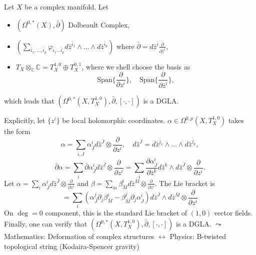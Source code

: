 \documentclass[10pt]{article}
\begin{document}
\begin{example}[Dolbeault + Lie = DGLA]
  Let $X$ be a complex manifold. Let
  \begin{itemize}
    \item $(\Omega^{0,*}(X), \bar{\partial})$ Dolbeault Complex,
    \item $(\sum_{\bar{i}_1,...,\bar{i}_p} \varphi_{\bar{i}_1...\bar{i}_p} d\bar{z}^{\bar{i}_1} \wedge ... \wedge d\bar{z}^{\bar{i}_p})$ where $\bar{\partial} = d\bar{z}^{\bar{i}} \frac{\partial}{\partial \bar{z}^i}$,
    \item $T_X \otimes_{\mathbb{C}} \mathbb{C} = T_X^{1,0} \oplus T_X^{0,1}$, where we shell choose the basis as
      \begin{equation*}
        \text{Span}\{\frac{\partial}{\partial z^i}\}, \quad \text{Span}\{\frac{\partial}{\partial \bar{z}^i}\},
      \end{equation*}
  \end{itemize}
  which leads that $(\Omega^{0,*}(X, T_X^{1,0}), \bar{\partial}, [\cdot,\cdot])$ is a DGLA.

  Explicitly, let $\{z^i\}$ be local holomorphic coordinates.
  $\alpha \in \Omega^{0,p}(X, T_X^{1,0})$ takes the form
  \begin{equation*}
    \alpha = \sum_{i,\bar{J}} \alpha_{\bar{J}}^i d\bar{z}^{\bar{J}} \otimes \frac{\partial}{\partial z^i}, \quad d\bar{z}^{\bar{J}} = d\bar{z}^{\bar{j}_1} \wedge ... \wedge d\bar{z}^{\bar{j}_p},
  \end{equation*}
  \begin{equation*}
    \bar{\partial}\alpha = \sum_i \bar{\partial}\alpha_{\bar{J}}^i d\bar{z}^{\bar{J}} \otimes \frac{\partial}{\partial z^i} = \sum_i \frac{\partial \alpha_{\bar{J}}^i}{\partial \bar{z}^k} d\bar{z}^k \wedge d\bar{z}^{\bar{J}} \otimes \frac{\partial}{\partial z^i}.
  \end{equation*}
  Let $\alpha = \sum_i \alpha_{\bar{J}}^i d\bar{z}^{\bar{J}} \otimes \frac{\partial}{\partial z^i}$ and $\beta = \sum_m \beta_{\bar{M}}^i d\bar{z}^{\bar{M}} \otimes \frac{\partial}{\partial z^i}$.
  The Lie bracket is
  \begin{equation*}
    [\alpha, \beta] = \sum_i \left(\alpha_{\bar{J}}^j \partial_j \beta_{\bar{M}}^i - \beta_{\bar{M}}^j \partial_j \alpha_{\bar{J}}^i\right) d\bar{z}^{\bar{J}} \wedge d\bar{z}^{\bar{M}} \otimes \frac{\partial}{\partial z^i}
  \end{equation*}
  On $\deg = 0$ component, this is the standard Lie bracket of $(1,0)$ vector fields. Finally, one can verify that $(\Omega^{0,*}(X, T_X^{1,0}), \bar{\partial}, [\cdot,\cdot])$ is a DGLA.
  \noindent $\leadsto$ Mathematics: Deformation of complex structures $\longleftrightarrow$ Physics: B-twisted topological string (Kodaira-Spencer gravity)
\end{example}
\end{document}
